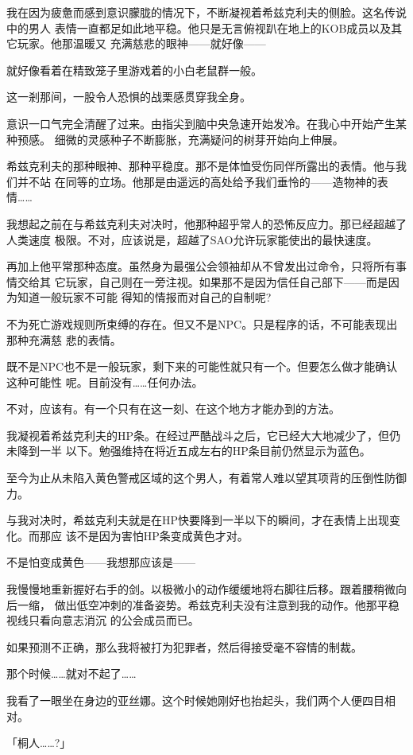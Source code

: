 \documentclass[11pt]{book}
\begin{document}
我在因为疲惫而感到意识朦胧的情况下，不断凝视着希兹克利夫的侧脸。这名传说中的男人
表情一直都足如此地平稳。他只是无言俯视趴在地上的KOB成员以及其它玩家。他那温暖又
充满慈悲的眼神——就好像——

就好像看着在精致笼子里游戏着的小白老鼠群一般。

这一剎那间，一股令人恐惧的战栗感贯穿我全身。

意识一口气完全清醒了过来。由指尖到脑中央急速开始发冷。在我心中开始产生某种预感。
细微的灵感种子不断膨胀，充满疑问的树芽开始向上伸展。

希兹克利夫的那种眼神、那种平稳度。那不是体恤受伤同伴所露出的表情。他与我们并不站
在同等的立场。他那是由遥远的高处给予我们垂怜的——造物神的表情……

我想起之前在与希兹克利夫对决时，他那种超乎常人的恐怖反应力。那已经超越了人类速度
极限。不对，应该说是，超越了SAO允许玩家能使出的最快速度。

再加上他平常那种态度。虽然身为最强公会领袖却从不曾发出过命令，只将所有事情交给其
它玩家，自己则在一旁注视。如果那不是因为信任自己部下——而是因为知道一般玩家不可能
得知的情报而对自己的自制呢?

不为死亡游戏规则所束缚的存在。但又不是NPC。只是程序的话，不可能表现出那种充满慈
悲的表情。

既不是NPC也不是一般玩家，剩下来的可能性就只有一个。但要怎么做才能确认这种可能性
呢。目前没有……任何办法。

不对，应该有。有一个只有在这一刻、在这个地方才能办到的方法。

我凝视着希兹克利夫的HP条。在经过严酷战斗之后，它已经大大地减少了，但仍未降到一半
以下。勉强维持在将近五成左右的HP条目前仍然显示为蓝色。

至今为止从未陷入黄色警戒区域的这个男人，有着常人难以望其项背的压倒性防御力。

与我对决时，希兹克利夫就是在HP快要降到一半以下的瞬间，才在表情上出现变化。而那应
该不是因为害怕HP条变成黄色才对。

不是怕变成黄色——我想那应该是——

我慢慢地重新握好右手的剑。以极微小的动作缓缓地将右脚往后移。跟着腰稍微向后一缩，
做出低空冲刺的准备姿势。希兹克利夫没有注意到我的动作。他那平稳视线只看向意志消沉
的公会成员而已。

如果预测不正确，那么我将被打为犯罪者，然后得接受毫不容情的制裁。

那个时候……就对不起了……

我看了一眼坐在身边的亚丝娜。这个时候她刚好也抬起头，我们两个人便四目相对。

「桐人……?」
\end{document}

